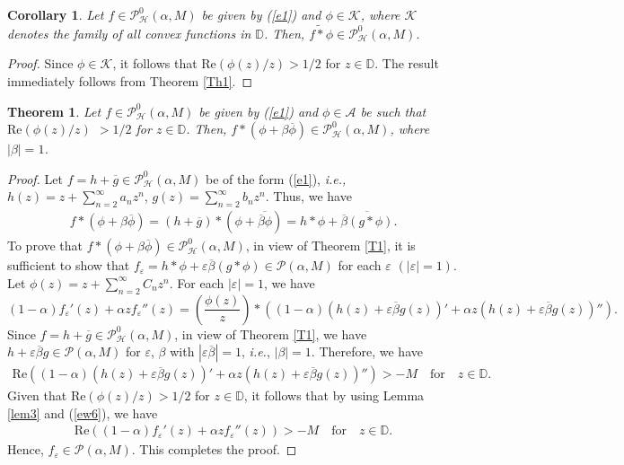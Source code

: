 \documentclass[11pt,reqno]{amsart}
\newtheorem{theo}{Theorem}[section]
\newtheorem{cor}{Corollary}[section]
\newtheorem{open problem}{Open problem}[section]
\newcommand{\ol}{\overline}
\newcommand{\be}{\begin{equation}}
\newcommand{\ee}{\end{equation}}
\newcommand{\beas}{\begin{eqnarray*}}
\newcommand{\eeas}{\end{eqnarray*}}
\renewcommand{\epsilon}{\varepsilon}
\numberwithin{equation}{section}
\begin{document}
\begin{cor} Let $f\in\mathcal{P}_{\mathcal{H}}^0(\alpha,M)$ be given by (\ref{e1}) and $\phi\in\mathcal{K}$, where $\mathcal{K}$ denotes the family of all convex functions in $\mathbb{D}$. Then, 
$f\tilde{*}\phi\in\mathcal{P}_{\mathcal{H}}^0(\alpha,M)$.\end{cor}
\begin{proof} Since $\phi\in\mathcal{K}$, it follows that $\text{Re}\left(\phi(z)/z\right)>1/2$ for $z\in\mathbb{D}$. The result immediately follows from \textrm{Theorem \ref{Th1}}.\end{proof}
\begin{theo}\label{Th2}
Let $f\in\mathcal{P}_{\mathcal{H}}^0(\alpha,M)$ be given by (\ref{e1}) and $\phi\in\mathcal{A}$ be such that $\text{Re}\left(\phi(z)/z\right)$ $>1/2$ for $z\in\mathbb{D}$. Then, 
$f*\left(\phi+\beta\ol{\phi}\right)\in\mathcal{P}_{\mathcal{H}}^0(\alpha,M)$, where $|\beta|=1$.\end{theo}
\begin{proof} Let $f=h+\ol{g}\in\mathcal{P}_{\mathcal{H}}^0(\alpha,M)$ be of the form (\ref{e1}), {\it i.e.,} $h(z)=z+\sum_{n=2}^\infty a_nz^n$, $g(z)=\sum_{n=2}^\infty b_nz^n$. Thus, we have
\beas f*\left(\phi+\beta\ol{\phi}\right)=\left(h+\ol{g}\right)*\left(\phi+\ol{\ol{\beta}\phi}\right)=h*\phi+\ol{\ol{\beta}(g*\phi)}.\eeas
To prove that $f*\left(\phi+\beta\ol{\phi}\right)\in\mathcal{P}_{\mathcal{H}}^0(\alpha,M)$, in view of \textrm{Theorem \ref{T1}}, it is sufficient to show that $f_{\epsilon}=h*\phi+\epsilon\ol{\beta}(g*\phi)\in\mathcal{P}(\alpha, M)$ for each $\epsilon$ $(|\epsilon|=1)$. Let $\phi(z)=z+\sum_{n=2}^\infty C_nz^n$. For each $|\epsilon|=1$, we have
\be\label{ew6}(1-\alpha)f_{\epsilon}'(z)+ \alpha zf_{\epsilon}''(z)=\left(\frac{\phi(z)}{z}\right)*\left((1-\alpha)\left(h(z)+\epsilon\ol{\beta}g(z)\right)'+\alpha z\left(h(z)+\epsilon\ol{\beta}g(z)\right)''\right).\ee
Since $f=h+\ol{g}\in\mathcal{P}_{\mathcal{H}}^0(\alpha,M)$, in view of \textrm{Theorem \ref{T1}}, we have $h+\epsilon \ol{\beta} g\in\mathcal{P}(\alpha, M)$ for $\epsilon$, 
$\beta$ with $|\epsilon\ol{\beta}|=1$, {\it i.e.}, $|\beta|=1$. Therefore, we have
 \beas\text{Re}\left((1-\alpha)\left(h(z)+\epsilon\ol{\beta}g(z)\right)'+\alpha z\left(h(z)+\epsilon\ol{\beta}g(z)\right)''\right)>-M\quad\text{for}\quad z\in\mathbb{D}.\eeas
Given that $\text{Re}\left(\phi(z)/z\right)>1/2$ for $z\in\mathbb{D}$, it follows that by using \textrm{Lemma \ref{lem3}} 
and (\ref{ew6}), we have 
\beas \text{Re}\left((1-\alpha)f_{\epsilon}'(z)+ \alpha zf_{\epsilon}''(z)\right)>-M\quad \text{for}\quad z\in\mathbb{D}.\eeas
Hence, $f_{\epsilon}\in\mathcal{P}(\alpha, M)$. This completes the proof.
\end{proof}
\end{document}
